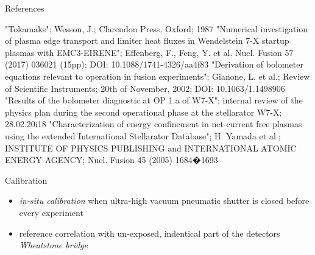 \documentclass[final]{beamer}
\begin{document}
\begin{frame}
\begin{minipage}[b]{0.32\textwidth}
\begin{kasten}{\large References}
{\begin{thebibliography}{}
              "Tokamaks"; %
                              Wesson, J.; %
                              Clarendon Press, Oxford; %
                              1987%
                "Numerical investigation of plasma edge %
                              transport and limiter heat fluxes in %
                              Wendelstein 7-X startup plasmas with %
                              EMC3-EIRENE"; %
                              Effenberg, F., Feng, Y. et al. %
                              Nucl. Fusion 57 (2017) 036021 (15pp); %
                              DOI: 10.1088/1741-4326/aa4f83%
         "Derivation of bolometer equations relevant to %
                              operation in fusion experiments"; %
                              Gianone, L. et al.; %
                              Review of Scientific Instruments; %
                              20th of November, 2002; %
                              DOI: 10.1063/1.1498906%
           "Results of the bolometer diagnostic at %
                              OP 1.a of W7-X"; %
                              internal review of the physics plan during the %
                              second operational phase at the stellarator %
                              W7-X; 28.02.20i18%
          "Characterization of energy confinement in %
                              net-current free plasmas using the %
                              extended International Stellarator Database"; %
                              H. Yamada et al.; %
                              INSTITUTE OF PHYSICS PUBLISHING and %
                              INTERNATIONAL ATOMIC ENERGY AGENCY; %
                              Nucl. Fusion 45 (2005) 1684�1693%
        \end{thebibliography}%
        }
      \end{kasten}%
    \end{minipage}%
    \hfill%
    \begin{minipage}[t]{0.32\textwidth}%
      \begin{kasten}{\large Calibration}%
        \vspace*{1cm}
        \tiny{%
          \begin{itemize}%
            \item{\textit{in-situ calibration} when ultra-high vacuum %
              pneumatic shutter is closed before every experiment}
            \item{reference correlation with un-exposed, %
              indentical part of the detectors \textit{Wheatstone bridge} %
}
\end{itemize}}
\end{kasten}
\end{minipage}
\end{frame}
\end{document}
